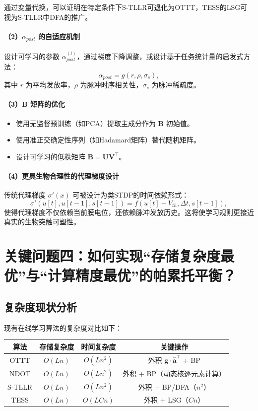 \documentclass[journal,12pt,onecolumn]{IEEEtran}
\begin{document}
通过变量代换，可以证明在特定条件下S-TLLR可退化为OTTT，TESS的LSG可视为S-TLLR中DFA的推广。

\paragraph{（2）\(\alpha_{post}\) 的自适应机制}
设计可学习的参数 \(\alpha_{post}^{(l)}\)，通过梯度下降调整，或设计基于任务统计量的启发式方法：
\[
\alpha_{post} = g(r, \rho, \sigma_s),
\]
其中 \(r\) 为平均发放率，\(\rho\) 为脉冲时序相关性，\(\sigma_s\) 为脉冲稀疏度。

\paragraph{（3）\(\mathbf{B}\) 矩阵的优化}
\begin{itemize}
    \item 使用无监督预训练（如PCA）提取主成分作为 \(\mathbf{B}\) 初始值。
    \item 使用准正交确定性序列（如Hadamard矩阵）替代随机矩阵。
    \item 设计可学习的低秩矩阵 \(\mathbf{B} = \mathbf{U}\mathbf{V}^\top\)。
\end{itemize}

\paragraph{（4）更具生物合理性的代理梯度设计}
传统代理梯度 \(\sigma'(x)\) 可被设计为类STDP的时间依赖形式：
\[
\sigma'(u[t], u[t-1], s[t-1]) = f\left(u[t] - V_{th}, \Delta t, s[t-1]\right),
\]
使得代理梯度不仅依赖当前膜电位，还依赖脉冲发放历史。这将使学习规则更接近真实的生物突触可塑性。

\section{关键问题四：如何实现“存储复杂度最优”与“计算精度最优”的帕累托平衡？}

\subsection{复杂度现状分析}

现有在线学习算法的复杂度对比如下：

\begin{center}
\begin{tabular}{c|c|c|c}
\hline
算法 & 存储复杂度 & 时间复杂度 & 关键操作 \\
\hline
OTTT & \(O(Ln)\) & \(O(Ln^2)\) & 外积 \(\mathbf{g}\cdot\hat{\mathbf{a}}^\top\) + BP \\
NDOT & \(O(Ln)\) & \(O(Ln^2)\) & 外积 + BP（动态核逐元素计算） \\
S-TLLR & \(O(Ln)\) & \(O(Ln^2)\) & 外积 + BP/DFA（\(n^2\)） \\
TESS & \(O(Ln)\) & \(O(LCn)\) & 外积 + LSG（\(Cn\)） \\
\hline
\end{tabular}
\end{center}
\end{document}
